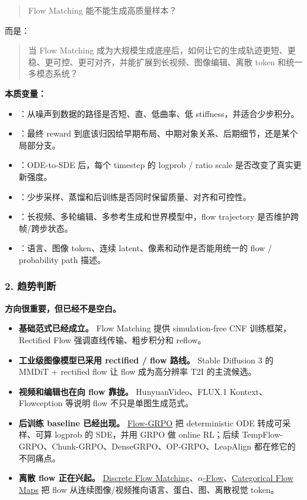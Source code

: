 \begin{quote}
Flow Matching 能不能生成高质量样本？
\end{quote}

而是：

\begin{quote}
当 Flow Matching 成为大规模生成底座后，如何让它的生成轨迹更短、更稳、更可控、更可对齐，并能扩展到长视频、图像编辑、离散 token 和统一多模态系统？
\end{quote}

\textbf{本质变量：}

\begin{itemize}[leftmargin=1.5em]
  \item {}：从噪声到数据的路径是否短、直、低曲率、低 stiffness，并适合少步积分。
  \item {}：最终 reward 到底该归因给早期布局、中期对象关系、后期细节，还是某个局部分支。
  \item {}：ODE-to-SDE 后，每个 timestep 的 logprob / ratio scale 是否改变了真实更新强度。
  \item {}：少步采样、蒸馏和后训练是否同时保留质量、对齐和可控性。
  \item {}：长视频、多轮编辑、多参考生成和世界模型中，flow trajectory 是否维护跨帧/跨步状态。
  \item {}：语言、图像 token、连续 latent、像素和动作是否能用统一的 flow / probability path 描述。
\end{itemize}

\subsubsection*{2. 趋势判断}

\textbf{方向很重要，但已经不是空白。}

\begin{itemize}[leftmargin=1.5em]
  \item \textbf{基础范式已经成立。} Flow Matching 提供 simulation-free CNF 训练框架，Rectified Flow 强调直线传输、粗步积分和 reflow。
  \item \textbf{工业级图像模型已采用 rectified / flow 路线。} Stable Diffusion 3 的 MMDiT + rectified flow 让 flow 成为高分辨率 T2I 的主流候选。
  \item \textbf{视频和编辑也在向 flow 靠拢。} HunyuanVideo、FLUX.1 Kontext、Flowception 等说明 flow 不只是单图生成范式。
  \item \textbf{后训练 baseline 已经出现。} \href{https://arxiv.org/abs/2505.05470}{Flow-GRPO} 把 deterministic ODE 转成可采样、可算 logprob 的 SDE，并用 GRPO 做 online RL；后续 TempFlow-GRPO、Chunk-GRPO、DenseGRPO、OP-GRPO、LeapAlign 都在修它的不同痛点。
  \item \textbf{离散 flow 正在兴起。} \href{https://arxiv.org/abs/2407.15595}{Discrete Flow Matching}、\href{https://arxiv.org/abs/2504.10283}{$\alpha$-Flow}、\href{https://arxiv.org/abs/2602.12233}{Categorical Flow Maps} 把 flow 从连续图像/视频推向语言、蛋白、图、离散视觉 token。
\end{itemize}

